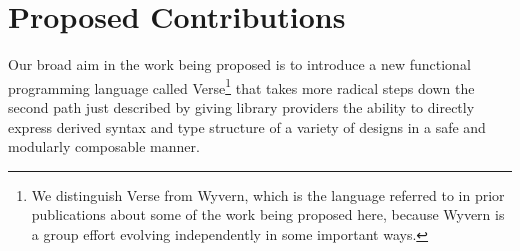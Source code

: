 \section{Proposed Contributions}
Our broad aim in the work being proposed is to introduce a new functional programming language called Verse\footnote{We distinguish Verse from Wyvern, which is the language referred to in prior publications about some of the work being proposed here, because Wyvern is a group effort evolving independently in some important ways.} that takes more radical steps down the second path just described by giving library providers the ability to directly express derived syntax and type structure of a variety of designs in a safe and modularly composable manner. %

